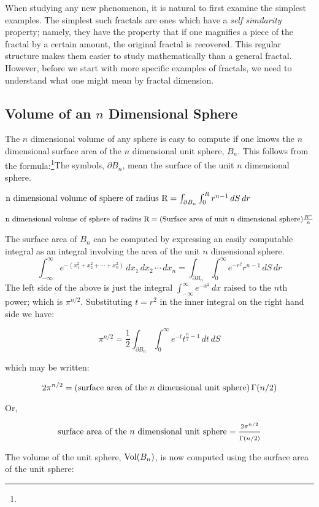 When studying any new phenomenon, it is natural to first examine the
simplest examples. The simplest such fractals are ones which have a
{\it self similarity} property; namely, they have the property that if
one magnifies a piece of the fractal by a certain amount, the original
fractal is recovered. This regular structure makes them easier to
study mathematically than a general fractal. However, before we start
with more specific examples of fractals, we need to understand what 
one might mean by fractal dimension.

\subsection{Volume of an $n$ Dimensional Sphere}
The $n$ dimensional volume of any sphere is easy to compute if one 
knows the $n$ dimensional surface area of the $n$ dimensional unit sphere, $B_n$.
This follows from the formula:\footnote{\dag}{The symbols, $\partial B_n$, mean the surface of the unit $n$ dimensional sphere.}

$\hbox{n dimensional volume of sphere of radius R} =  \int_{\partial B_n} \int_0^R r^{n-1} \,dS \,dr$

$\hbox{n dimensional volume of sphere of radius R} =  (\hbox{Surface area of unit $n$ dimensional sphere}) \frac{R^n}{n}$

The surface area of $B_n$ can be computed by expressing an easily computable 
integral as an integral involving the area of the unit $n$ dimensional sphere.
$$
\int_{-\infty}^{\infty} e^{-(x_1^2 + x_2^2 + \cdots + x_n^2)} \, dx_1\, dx_2
\, \cdots \, dx_n = \int_{\partial B_n} \int_0^\infty e^{-r^2} r^{n-1} \,
dS\, dr
$$
The left side of the above is just the integral
$\int_{-\infty}^{\infty} e^{-x^2} \, dx$ raised to the $n$th power;
which is $\pi^{n/2}$. Substituting $t = r^2$ in the inner integral on
the right hand side we have:

$$
\pi^{n/2} = \frac{1}{2} \int_{\partial B_n} \int_0^\infty 
e^{-t} t^{\frac{n}{2}-1} \,dt \, dS
$$

which may be written:

$$
2 \pi^{n/2} = \left( 
{\hbox{\rm surface area of the $n$ dimensional unit sphere}}\right) \Gamma(n/2)
$$

Or,

$$
{\hbox{\rm surface area of the $n$ dimensional unit sphere}} = 
\frac{2 \pi^{n/2}}{\Gamma(n/2)}
$$

The volume of the unit sphere, ${\rm Vol}(B_n)$, is now computed using the
surface area of the unit sphere:

